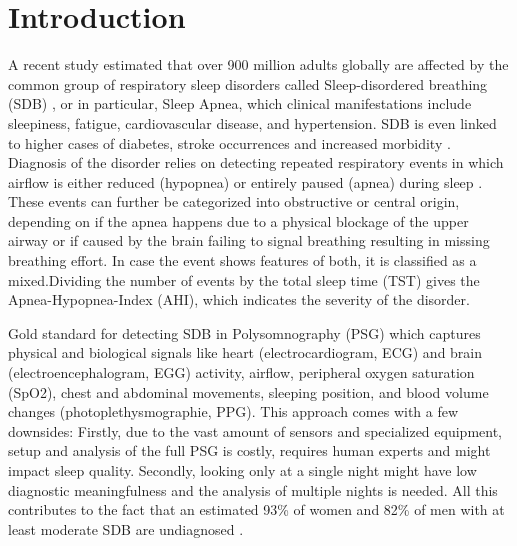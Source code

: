 \chapter{Introduction \label{Chapter-Intro}}

A recent study estimated that over 900 million adults globally are affected by the common group of respiratory sleep disorders called Sleep-disordered breathing (SDB) \cite{benjafield2019estimation}, or in particular, Sleep Apnea, which clinical manifestations include sleepiness, fatigue, cardiovascular disease, and hypertension. SDB is even linked to higher cases of diabetes, stroke occurrences and increased morbidity \cite{dempsey2010dempsey,patil2007adult,young2002epidemiology}.
Diagnosis of the disorder relies on detecting repeated respiratory events in which airflow is either reduced (hypopnea) or entirely paused (apnea) during sleep \cite{dempsey2010dempsey,gould2012sleep}. These events can further be categorized into obstructive or central origin, depending on if the apnea happens due to a physical blockage of the upper airway or if caused by the brain failing to signal breathing resulting in missing breathing effort. In case the event shows features of both, it is classified as a mixed.Dividing the number of events by the total sleep time (TST) gives the Apnea-Hypopnea-Index (AHI), which indicates the severity of the disorder.

Gold standard for detecting SDB in Polysomnography (PSG) which captures physical and biological signals like heart (electrocardiogram, ECG) and brain (electroencephalogram, EGG) activity, airflow, peripheral oxygen saturation (SpO2), chest and abdominal movements, sleeping position, and blood volume changes (photoplethysmographie, PPG).
This approach comes with a few downsides: Firstly, due to the vast amount of sensors and specialized equipment, setup and analysis of the full PSG is costly, requires human experts and might impact sleep quality. Secondly, looking only at a single night might have low diagnostic meaningfulness \cite{toussaint1995first} and the analysis of multiple nights is needed. All this contributes to the fact that an estimated 93\% of women and 82\% of men with at least moderate SDB are undiagnosed \cite{young1997estimation}.

